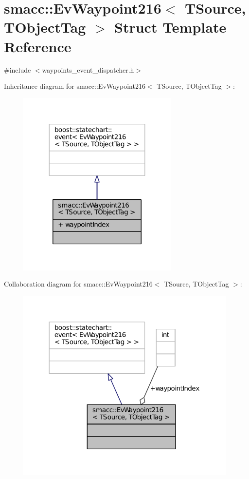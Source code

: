 \hypertarget{structsmacc_1_1EvWaypoint216}{}\section{smacc\+:\+:Ev\+Waypoint216$<$ T\+Source, T\+Object\+Tag $>$ Struct Template Reference}
\label{structsmacc_1_1EvWaypoint216}


{\ttfamily \#include $<$waypoints\+\_\+event\+\_\+dispatcher.\+h$>$}



Inheritance diagram for smacc\+:\+:Ev\+Waypoint216$<$ T\+Source, T\+Object\+Tag $>$\+:
\nopagebreak
\begin{figure}[H]
\begin{center}
\leavevmode
\includegraphics[width=227pt]{structsmacc_1_1EvWaypoint216__inherit__graph}
\end{center}
\end{figure}


Collaboration diagram for smacc\+:\+:Ev\+Waypoint216$<$ T\+Source, T\+Object\+Tag $>$\+:
\nopagebreak
\begin{figure}[H]
\begin{center}
\leavevmode
\includegraphics[width=312pt]{structsmacc_1_1EvWaypoint216__coll__graph}
\end{center}
\end{figure}
